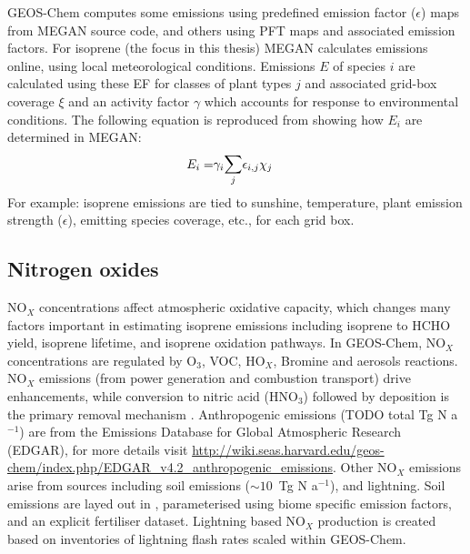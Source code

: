     GEOS-Chem computes some emissions using predefined emission factor ($\epsilon$) maps from MEGAN source code, and others using PFT maps and associated emission factors.
    For isoprene (the focus in this thesis) MEGAN calculates emissions online, using local meteorological conditions.
    Emissions $E$ of species $i$ are calculated using these EF for classes of plant types $j$ and associated grid-box coverage $\xi$ and an activity factor $\gamma$ which accounts for response to environmental conditions.
    The following equation is reproduced from \textcite{Guenther2012} showing how $E_i$ are determined in MEGAN: 
    \begin{eqnarray} 
      \label{Model:GC:MEGAN:eqn_emission_factors}
      E_i = & \gamma_i \mathlarger{\sum}_j{\epsilon_{i,j} \chi_j}
    \end{eqnarray}
    For example: isoprene emissions are tied to sunshine, temperature, plant emission strength ($\epsilon$), emitting species coverage, etc., for each grid box.
    
  
  \subsection{Nitrogen oxides}
  \label{Model:GC:NOx}
    NO$_X$ concentrations affect atmospheric oxidative capacity, which changes many factors important in estimating isoprene emissions including isoprene to HCHO yield, isoprene lifetime, and isoprene oxidation pathways.
    In GEOS-Chem, NO$_X$ concentrations are regulated by O$_3$, VOC, HO$_X$, Bromine and aerosols reactions.
    NO$_X$ emissions (from power generation and combustion transport) drive enhancements, while conversion to nitric acid (HNO$_3$) followed by deposition is the primary removal mechanism \parencite{Delmas1997, Ayers2006}.
    Anthropogenic emissions (TODO total Tg N a$^{-1}$) are from the Emissions Database for Global Atmospheric Research (EDGAR), for more details visit \url{http://wiki.seas.harvard.edu/geos-chem/index.php/EDGAR_v4.2_anthropogenic_emissions}.
    Other NO$_X$ emissions arise from sources including soil emissions ($\sim 10$~Tg N a$^{-1}$), and lightning.
    Soil emissions are layed out in \textcite{Hudson2012}, parameterised using biome specific emission factors, and an explicit fertiliser dataset.
    Lightning based NO$_X$ production is created based on inventories of lightning flash rates scaled within GEOS-Chem.
    
